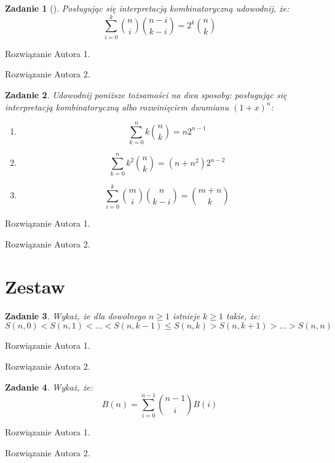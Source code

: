 \documentclass{mwart}
\newtheorem{zad}{Zadanie}[section]
\begin{document}
\begin{zad}[]
    Posługując się interpretacją kombinatoryczną udowodnij, że:
    \[ \sum_{i=0}^{k} \binom{n}{i} \binom{n-i}{k-i} = 2^k \binom{n}{k} \]
\end{zad}
\begin{mdframed}
    Rozwiązanie Autora 1.
\end{mdframed}
\begin{mdframed}
    Rozwiązanie Autora 2.
\end{mdframed}




\begin{zad}
    Udowodnij poniższe tożsamości na dwa sposoby: posługując się interpretacją
    kombinatoryczną albo rozwinięciem dwumianu $(1 + x)^n$:
    \begin{enumerate}
        \item \[\sum_{k=0}^{n}k\binom{n}{k} = n2^{n-1}\]
        \item \[\sum_{k=0}^{n}k^2\binom{n}{k}= (n+n^2)2^{n-2}\]
        \item \[\sum_{i=0}^{k}\binom{m}{i}\binom{n}{k-i} = \binom{m+n}{k} \]
    \end{enumerate}
\end{zad}
\begin{mdframed}
    Rozwiązanie Autora 1.
\end{mdframed}
\begin{mdframed}
    Rozwiązanie Autora 2.
\end{mdframed}








\newpage
\section{Zestaw}          %

\begin{zad}
    Wykaż, że dla dowolnego $n \geq 1$ istnieje $k \geq 1$ takie, że:
    \[S(n, 0) < S(n, 1) < ... < S(n, k - 1 ) \leq S(n, k) > S(n, k+1) > ... > S(n, n)\]
\end{zad}
\begin{mdframed}
    Rozwiązanie Autora 1.
\end{mdframed}
\begin{mdframed}
    Rozwiązanie Autora 2.
\end{mdframed}




\begin{zad}
    Wykaż, że:
    \[B(n) = \sum_{i=0}^{n-1} \binom{n-1}{i}B(i)\]
\end{zad}
\begin{mdframed}
    Rozwiązanie Autora 1.
\end{mdframed}
\begin{mdframed}
    Rozwiązanie Autora 2.
\end{mdframed}
\end{document}
